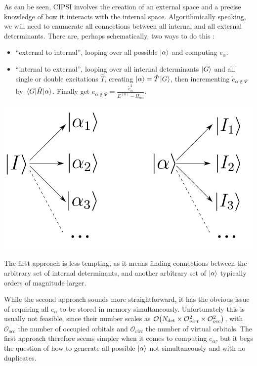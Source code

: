 \documentclass[./thesis.tex]{subfiles}
\begin{document}
As can be seen, CIPSI involves the creation of an external space and a precise knowledge of how it interacts with the internal space. Algorithmically speaking, we will need to enumerate all connections between all internal and all external determinants.
There are, perhaps schematically, two ways to do this :

\begin{itemize}
\item
``external to internal'', looping over all possible ${\ket{\alpha}}$ and computing $e_\alpha$.
\item
``internal to external'', looping over all internal determinants $\ket G$ and all single or double excitations $\hat T$, creating ${\ket{\alpha}} = \hat T \ket G$, then incrementing $\tilde e_{\alpha \notin \Psi}$ by $\mel{G}{\hat{H}}{\alpha}$. Finally get $e_{\alpha \notin \Psi} = \frac{\tilde e_\alpha^2}{E^{(n)} - H_{\alpha \alpha}}$.
\end{itemize}

	\begin{center}
		\includegraphics[width=0.5\columnwidth]{figures/matrix_dressing/interactions}
	\end{center}

The first approach is less tempting, as it means finding connections between the arbitrary set of internal determinants, and another arbitrary set of ${\ket{\alpha}}$ typically orders of magnitude larger.

While the second approach sounds more straightforward, it has the obvious issue of requiring all $e_\alpha$ to be stored in memory simultaneously. Unfortunately this is usually not feasible, since their number scales as $\order{\Ndet \times \mathcal{O}_{virt}^2 \times \mathcal{O}_{occ}^2}$, with $\mathcal{O}_{occ}$ the number of occupied orbitals and $\mathcal{O}_{virt}$ the number of virtual orbitals.
The first approach therefore seems simpler when it comes to computing $e_\alpha$, but it begs the question of how to generate all possible ${\ket{\alpha}}$ not simultaneously and with no duplicates. 
\end{document}
